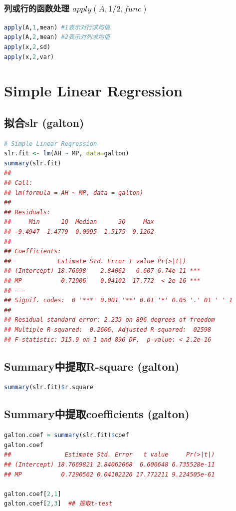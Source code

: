 \documentclass[11pt,a4paper]{article}
\begin{document}
\subsubsection{列或行的函数处理 $apply(A,1/2,func)$}
\begin{lstlisting}[language=R]
apply(A,1,mean) #1表示对行求均值
apply(A,2,mean) #2表示对列求均值
apply(x,2,sd)
apply(x,2,var)
\end{lstlisting}


\section{Simple Linear Regression}
\subsection{拟合slr (galton)}
\begin{lstlisting}[language=R]
# Simple Linear Regression
slr.fit <- lm(AH ~ MP, data=galton)
summary(slr.fit)
## 
## Call:
## lm(formula = AH ~ MP, data = galton)
## 
## Residuals:
##     Min      1Q  Median      3Q     Max 
## -9.4947 -1.4779  0.0995  1.5175  9.1262 
## 
## Coefficients:
##             Estimate Std. Error t value Pr(>|t|)    
## (Intercept) 18.76698    2.84062   6.607 6.74e-11 ***
## MP           0.72906    0.04102  17.772  < 2e-16 ***
## ---
## Signif. codes:  0 '***' 0.001 '**' 0.01 '*' 0.05 '.' 01 ' ' 1
## 
## Residual standard error: 2.233 on 896 degrees of freedom
## Multiple R-squared:  0.2606, Adjusted R-squared:  02598 
## F-statistic: 315.9 on 1 and 896 DF,  p-value: < 2.2e-16
\end{lstlisting}

\subsection{Summary中提取R-square (galton)}
\begin{lstlisting}[language=R]
summary(slr.fit)$r.square
\end{lstlisting}
\subsection{Summary中提取coefficients (galton)}
\begin{lstlisting}[language=R]
galton.coef = summary(slr.fit)$coef
galton.coef
##               Estimate Std. Error   t value     Pr(>|t|)
## (Intercept) 18.7669821 2.84062068  6.606648 6.735528e-11
## MP           0.7290562 0.04102226 17.772211 9.224505e-61

galton.coef[2,1]
galton.coef[2,3]  ## 提取t-test
\end{lstlisting}
\end{document}
